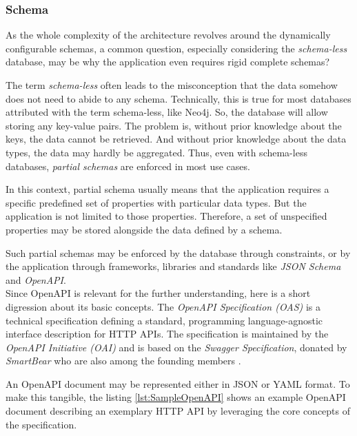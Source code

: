 \subsubsection{Schema}
As the whole complexity of the architecture revolves around the dynamically configurable schemas, a common question, especially considering the \emph{schema-less} database, may be why the application even requires rigid complete schemas?\par
The term \emph{schema-less} often leads to the misconception that the data somehow does not need to abide to any schema. Technically, this is true for most databases attributed with the term schema-less, like Neo4j. So, the database will allow storing any key-value pairs. The problem is, without prior knowledge about the keys, the data cannot be retrieved. And without prior knowledge about the data types, the data may hardly be aggregated. Thus, even with schema-less databases, \emph{partial schemas} are enforced in most use cases.\par
In this context, partial schema usually means that the application requires a specific predefined set of properties with particular data types. But the application is not limited to those properties. Therefore, a set of unspecified properties may be stored alongside the data defined by a schema.\par 
Such partial schemas may be enforced by the database through constraints, or by the application through frameworks, libraries and standards like \emph{JSON Schema} \cite{JsonSchema} and \emph{OpenAPI}.\\

Since OpenAPI is relevant for the further understanding, here is a short digression about its basic concepts. The \emph{OpenAPI Specification (OAS)} is a technical specification defining a standard, programming language-agnostic interface description for HTTP APIs. The specification is maintained by the \emph{OpenAPI Initiative (OAI)} and is based on the \emph{Swagger Specification}, donated by \emph{SmartBear} who are also among the founding members \cite{OpenAPISpec}.\par
An OpenAPI document may be represented either in JSON or YAML format. To make this tangible, the listing \ref{lst:SampleOpenAPI} shows an example OpenAPI document describing an exemplary HTTP API by leveraging the core concepts of the specification.\\

